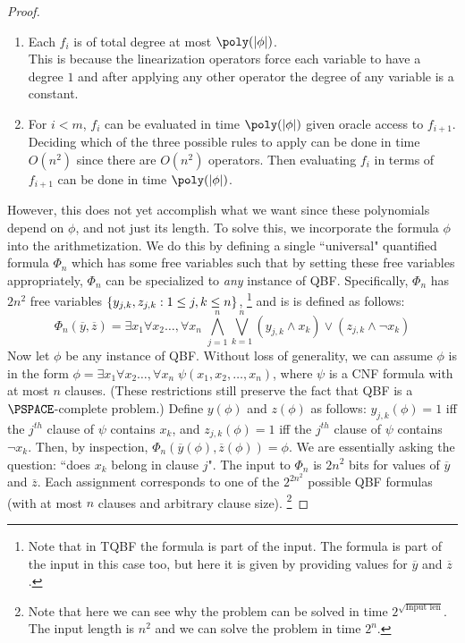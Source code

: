 \begin{proof}
\begin{enumerate}
	\item Each $f_i$ is of total degree at most $\poly(\card{\phi})$. \\
	This is because the linearization operators force each variable to have a degree $1$ and after applying any other operator the degree of any variable is a constant.
	
	\item For $i < m$, $f_i$ can be evaluated in time $\poly(\card{\phi})$ given oracle access to $f_{i+1}$. \\
	Deciding which of the three possible rules to apply can be done in time $O(n^2)$ since there are $O(n^2)$ operators. Then evaluating $f_i$ in terms of $f_{i+1}$ can be done in time $\poly(\card{\phi})$.
\end{enumerate}

However, this does not yet accomplish what we want since these polynomials depend on $\phi$, and not just its length. To solve this, we incorporate the formula $\phi$ into the arithmetization. We do this by defining a single ``universal" quantified formula $\Phi_n$ which has some free variables such that by setting these free variables appropriately, $\Phi_n$ can be specialized to \emph{any} instance of QBF. Specifically, $\Phi_n$ has $2n^2$ free variables $\{y_{j,k}, z_{j,k} : 1 \leq j, k \leq n\}$, \footnote{Note that in TQBF the formula is part of the input. The formula is part of the input in this case too, but here it is given by providing values for $\overline{y}$ and $\overline{z}$. }
and is is defined as follows:
\[
	\Phi_n(\overline{y}, \overline{z}) = \exists x_1 \forall x_2 \ldots , \forall x_n \; \bigwedge_{j=1}^n \bigvee_{k=1}^n (y_{j,k} \wedge x_k) \vee (z_{j,k} \wedge \neg x_k)
\]
Now let $\phi$ be any instance of QBF. Without loss of generality, we can assume $\phi$ is in the form $\phi = \exists x_1 \forall x_2 \ldots , \forall x_n \; \psi(x_1,x_2, \ldots, x_n)$, where $\psi$ is a CNF formula with at most $n$ clauses. (These restrictions still preserve the fact that QBF is a $\PSPACE$-complete problem.)
Define $y(\phi)$ and $z(\phi)$ as follows: $y_{j,k}(\phi) = 1$ iff the $j^{th}$ clause of $\psi$ contains $x_k$, and $z_{j,k}(\phi) = 1$ iff the $j^{th}$ clause of $\psi$ contains $\neg x_k$. Then, by inspection, $\Phi_n(\overline{y}(\phi), \overline{z}(\phi)) = \phi$.
We are essentially asking the question: ``does $x_k$ belong in clause $j$". The input to $\Phi_n$ is $2n^2$ bits for values of $\overline{y}$ and $\overline{z}$. Each assignment corresponds to one of the $2^{2n^2}$ possible QBF formulas (with at most $n$ clauses and arbitrary clause size). \footnote{Note that here we can see why the problem can be solved in time $2^{\sqrt{\text{Input len}}}$. The input length is $n^2$ and we can solve the problem in time $2^n$.}



\end{proof}
